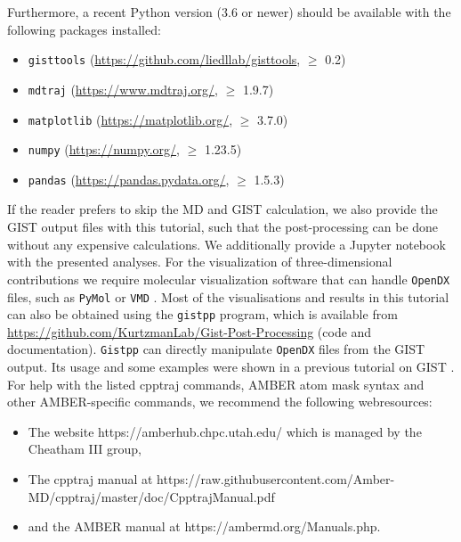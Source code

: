 \documentclass[9pt,tutorial]{livecoms}
\newcommand{\software}{\texttt}
\begin{document}
Furthermore, a recent Python version (3.6 or newer) should be available with the following packages installed:
\begin{itemize}
	\item \software{gisttools} (\url{https://github.com/liedllab/gisttools}, $\geq$ 0.2)
	\item \software{mdtraj} (\url{https://www.mdtraj.org/}, $\geq$ 1.9.7) \cite{McGibbon2015-mdtraj}
	\item \software{matplotlib} (\url{https://matplotlib.org/}, $\geq$ 3.7.0) \cite{Hunter2007-matplotlib}
	\item \software{numpy} (\url{https://numpy.org/}, $\geq$ 1.23.5) \cite{harris2020-numpy}
	\item \software{pandas} (\url{https://pandas.pydata.org/}, $\geq$ 1.5.3) \cite{pandas-2023_8239932}
\end{itemize}
If the reader prefers to skip the MD and GIST calculation, we also provide the GIST output files with this tutorial, such that the post-processing can be done without any expensive calculations.
We additionally provide a Jupyter notebook \cite{Kluyver2016-jupyter,Granger2021-jupyter} with the presented analyses. 
For the visualization of three-dimensional contributions we require molecular visualization software that can handle \software{OpenDX} files, such as \software{PyMol} \cite{pymol} or \software{VMD} \cite{vmd}.
Most of the visualisations and results in this tutorial can also be obtained using the \software{gistpp} program, which is available from \url{https://github.com/KurtzmanLab/Gist-Post-Processing} (code and documentation). \software{Gistpp} can directly manipulate \software{OpenDX} files from the GIST output. 
Its usage and some examples were shown in a previous tutorial on GIST \cite{Ramsey2016}.
For help with the listed cpptraj commands, AMBER atom mask syntax and other AMBER-specific commands, we recommend the following webresources:\\
\begin{itemize}
\item The website https://amberhub.chpc.utah.edu/ which is managed by the Cheatham III group, 
\item The cpptraj manual at https://raw.githubusercontent.com/Amber-MD/cpptraj/master/doc/CpptrajManual.pdf 
\item and the AMBER manual \cite{amber24} at https://ambermd.org/Manuals.php.
\end{itemize}
\pagebreak %
\end{document}
